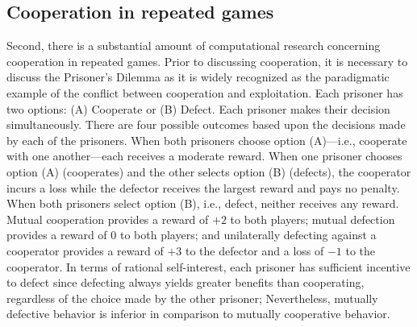 \documentclass[10pt]{article} %
\begin{document}
\subsection{Cooperation in repeated games}
Second, there is a substantial amount of computational research
concerning cooperation in repeated games. Prior to discussing
cooperation, it is necessary to discuss the Prisoner's Dilemma as it
is widely recognized as the paradigmatic example of the conflict
between cooperation and exploitation. Each prisoner has two options:
(A) Cooperate or (B) Defect. Each prisoner makes their decision
simultaneously. There are four possible outcomes based upon the
decisions made by each of the prisoners. When both prisoners choose
option (A)---i.e., cooperate with one another---each receives a
moderate reward. When one prisoner chooses option (A) (cooperates)
and the other selects option (B) (defects), the cooperator incurs a
loss while the defector receives the largest reward and pays no
penalty. When both prisoners select option (B), i.e., defect,
neither receives any reward. Mutual cooperation provides
a reward of $+2$ to both players; mutual defection provides a reward
of $0$ to both players; and unilaterally defecting against a
cooperator provides a reward of $+3$ to the defector and a loss of
$-1$ to the cooperator. In terms of rational self-interest, each prisoner has
sufficient incentive to defect since defecting always yields greater
benefits than cooperating, regardless of the choice made by the
other prisoner; Nevertheless, mutually defective behavior is
inferior in comparison to mutually cooperative behavior.
\end{document}
